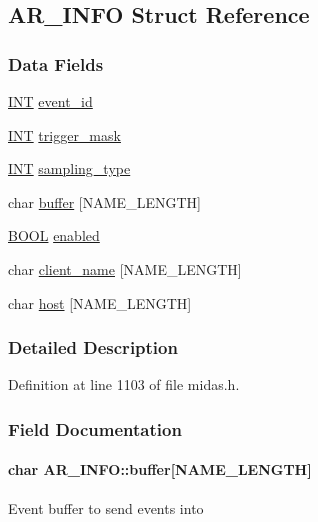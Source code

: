 \subsection{AR\_\-INFO Struct Reference}
\label{structAR__INFO}
\subsubsection*{Data Fields}
\begin{DoxyCompactItemize}
\item 
\hyperlink{vppg_8h_a392e62da233ed3e2f7c3fd4f487a3896}{INT} \hyperlink{structAR__INFO_acb0cf26c5067b0c8eb7a895b70e42f11}{event\_\-id}
\item 
\hyperlink{vppg_8h_a392e62da233ed3e2f7c3fd4f487a3896}{INT} \hyperlink{structAR__INFO_a947c408489c2b8cd8ea2fc8b2df83388}{trigger\_\-mask}
\item 
\hyperlink{vppg_8h_a392e62da233ed3e2f7c3fd4f487a3896}{INT} \hyperlink{structAR__INFO_a023ac635bfecdb696c795dc7120209b7}{sampling\_\-type}
\item 
char \hyperlink{structAR__INFO_a8b5be2917680552f8f9850c8bd7f9b4b}{buffer} \mbox{[}NAME\_\-LENGTH\mbox{]}
\item 
\hyperlink{vt2_8h_a239c7f0d40651c3e419c5b9651507d14}{BOOL} \hyperlink{structAR__INFO_a00b6cb7dc5fefe2d78d04caf3eb257cd}{enabled}
\item 
char \hyperlink{structAR__INFO_a1331a0c0525a7f42a0f9c23d897cf46c}{client\_\-name} \mbox{[}NAME\_\-LENGTH\mbox{]}
\item 
char \hyperlink{structAR__INFO_ae70ac5ffc29fabfaf9a87e717f75dae0}{host} \mbox{[}NAME\_\-LENGTH\mbox{]}
\end{DoxyCompactItemize}


\subsubsection{Detailed Description}


Definition at line 1103 of file midas.h.

\subsubsection{Field Documentation}
\paragraph[{buffer}]{\setlength{\rightskip}{0pt plus 5cm}char {\bf AR\_\-INFO::buffer}\mbox{[}NAME\_\-LENGTH\mbox{]}}\hfill\label{structAR__INFO_a8b5be2917680552f8f9850c8bd7f9b4b}
Event buffer to send events into 

